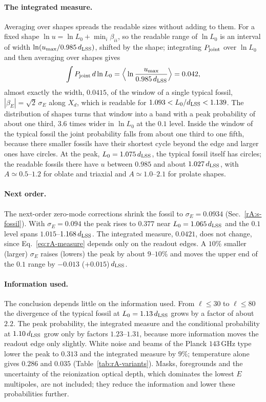 \paragraph{The integrated measure.}
Averaging over shapes spreads the readable sizes without adding to them.
For a fixed shape $\ln u=\ln L_0+\min_i\beta_{ii}$, so the readable range of $\ln L_0$ is an interval of width $\ln(u_{\max}/0.985\,d_{\mathrm{LSS}})$, shifted by the shape; integrating $P_{\rm joint}$ over $\ln L_0$ and then averaging over shapes gives
\begin{equation}
\int P_{\rm joint}\,d\ln L_0=\Big\langle\ln\frac{u_{\max}}{0.985\,d_{\mathrm{LSS}}}\Big\rangle=0.042,
\label{eq:rA-measure}
\end{equation} %
almost exactly the width, $0.0415$, of the window of a single typical fossil, $|\beta_E|=\sqrt2\,\sigma_E$ along $X_d$, which is readable for $1.093<L_0/d_{\mathrm{LSS}}<1.139$. %
The distribution of shapes turns that window into a band with a peak probability of about one third, $3.6$ times wider in $\ln L_0$ at the $0.1$ level. %
Inside the window of the typical fossil the joint probability falls from about one third to one fifth, because there smaller fossils have their shortest cycle beyond the edge and larger ones have circles. %
At the peak, $L_0=1.075\,d_{\mathrm{LSS}}$, the typical fossil itself has circles; the readable fossils there have $u$ between $0.985$ and about $1.027\,d_{\mathrm{LSS}}$, with $A\simeq0.5$--$1.2$ for oblate and triaxial and $A\simeq1.0$--$2.1$ for prolate shapes. %

\paragraph{Next order.}
The next-order zero-mode corrections shrink the fossil to $\sigma_E=0.0934$ (Sec.~\ref{rA:s-fossil}). %
With $\sigma_E=0.094$ the peak rises to $0.377$ near $L_0=1.065\,d_{\mathrm{LSS}}$ and the $0.1$ level spans $1.015$--$1.168\,d_{\mathrm{LSS}}$. %
The integrated measure, $0.0421$, does not change, since Eq.~\eqref{eq:rA-measure} depends only on the readout edges. %
A $10\%$ smaller (larger) $\sigma_E$ raises (lowers) the peak by about $9$--$10\%$ and moves the upper end of the $0.1$ range by $-0.013$ ($+0.015$)\,$d_{\mathrm{LSS}}$. %

\paragraph{Information used.}
The conclusion depends little on the information used.
From $\ell\leq30$ to $\ell\leq80$ the divergence of the typical fossil at $L_0=1.13\,d_{\mathrm{LSS}}$ grows by a factor of about $2.2$. %
The peak probability, the integrated measure and the conditional probability at $1.10\,d_{\mathrm{LSS}}$ grow only by factors $1.23$--$1.31$, because more information moves the readout edge only slightly. %
White noise and beams of the Planck $143$\,GHz type lower the peak to $0.313$ and the integrated measure by $9\%$; temperature alone gives $0.286$ and $0.035$ (Table~\ref{tab:rA-variants}). %
Masks, foregrounds and the uncertainty of the reionization optical depth, which dominates the lowest $E$ multipoles, are not included; they reduce the information and lower these probabilities further.


